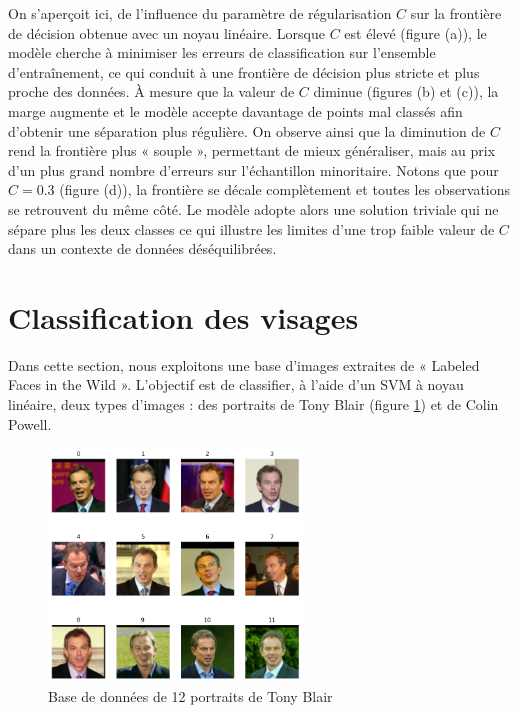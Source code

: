 \documentclass[a4paper,12pt]{article}
\begin{document}
On s'aperçoit ici, de l’influence du paramètre de régularisation $C$ sur la frontière de décision obtenue avec un noyau linéaire.  
Lorsque $C$ est élevé (figure (a)), le modèle cherche à minimiser les erreurs de classification sur l’ensemble d’entraînement, ce qui conduit à une frontière de décision plus stricte et plus proche des données. 
À mesure que la valeur de $C$ diminue (figures (b) et (c)), la marge augmente et le modèle accepte davantage de points mal classés afin d’obtenir une séparation plus régulière.  
On observe ainsi que la diminution de $C$ rend la frontière plus « souple », permettant de mieux généraliser, mais au prix d’un plus grand nombre d’erreurs sur l’échantillon minoritaire. 
Notons que pour $C = 0.3$ (figure (d)), la frontière se décale complètement et toutes les observations se retrouvent du même côté. 
Le modèle adopte alors une solution triviale qui ne sépare plus les deux classes ce qui illustre les limites d’une trop faible valeur de $C$ dans un contexte de données déséquilibrées.  

\newpage

\section{Classification des visages}

Dans cette section, nous exploitons une base d'images extraites de « Labeled Faces in the Wild ».
L'objectif est de classifier, à l'aide d'un SVM à noyau linéaire, deux types d'images : des portraits de Tony Blair (figure \ref{fig : visages}) et de Colin Powell. 


\begin{figure}[H]
    \centering
    \includegraphics[width=0.6\textwidth]{Images/visages.png}
    \caption{Base de données de 12 portraits de Tony Blair}\label{fig : visages}
\end{figure}
\end{document}
